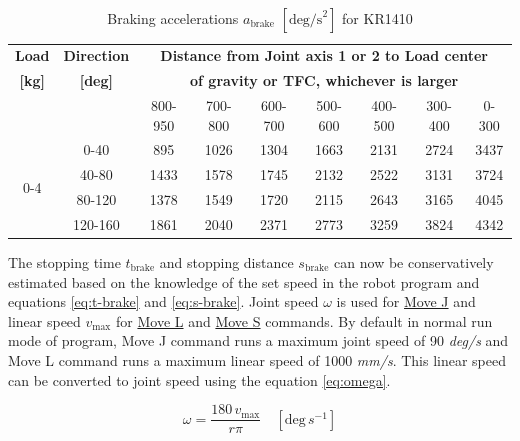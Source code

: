     \begin{table}[h]
        \centering
        \renewcommand{\arraystretch}{1.2} %
        \small
        \setlength{\tabcolsep}{4.5pt} %
        \begin{tabular}{cc|*{7}{c}}
            \hline
            \textbf{Load} & \textbf{Direction} & 
            \multicolumn{7}{c}{\textbf{Distance from Joint axis 1 or 2 to Load center}} \\
            \textbf{[kg]} & \textbf{[deg]} & 
            \multicolumn{7}{c}{\textbf{of gravity or TFC, whichever is larger}} \\
            \cline{3-9}
            & & 800-950 & 700-800 & 600-700 & 500-600 & 400-500 & 300-400 & 0-300 \\
            \hline
            \multirow{4}{*}{0-4}  & 0-40  & 895  & 1026 & 1304 & 1663 & 2131 & 2724 & 3437 \\
                                & 40-80 & 1433 & 1578 & 1745 & 2132 & 2522 & 3131 & 3724 \\
                                & 80-120 & 1378 & 1549 & 1720 & 2115 & 2643 & 3165 & 4045 \\
                                & 120-160 & 1861 & 2040 & 2371 & 2773 & 3259 & 3824 & 4342 \\
            \hline
        \end{tabular}
        \caption{Braking accelerations \hyperref[sym:a-brake]{$a_{\text{brake}}$} \textit{$[\text{deg/s}^2]$} for KR1410}
        \label{tab:braking_accelerations}
    \end{table}

    The stopping time \hyperref[sym:t-brake]{$t_{\text{brake}}$} and stopping distance \hyperref[sym:s-brake]{$s_{\text{brake}}$} can now be conservatively estimated based on the knowledge of the set speed
    in the robot program and equations \ref{eq:t-brake} and \ref{eq:s-brake}. Joint speed \hyperref[sym:omega]{$\omega$} is used for \hyperref[acro:Move J]{Move J} and linear speed \hyperref[sym:v-max]{$v_{\text{max}}$} for \hyperref[acro:Move L]{Move L} and \hyperref[acro:Move S]{Move S} commands.
    By default in normal run mode of program, Move J command runs a maximum joint speed of 90 \textit{deg/s} and
    Move L command runs a maximum linear speed of 1000 \textit{mm/s}. This linear speed can be converted to joint speed
    using the equation \ref{eq:omega}.

    \begin{equation}
        \omega = \frac{180 \, v_{\text{max}}}{r\pi} \quad [\text{deg} \, s^{-1}]
        \label{eq:omega}
    \end{equation}
                
